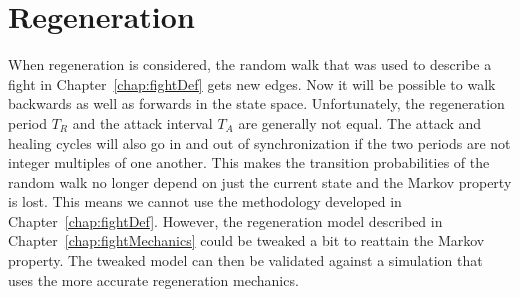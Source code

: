 \section{Regeneration}\label{chap:regen}
When regeneration is considered, the random walk that was used to describe a fight in Chapter~\ref{chap:fightDef} gets new edges. Now it will be possible to walk backwards as well as forwards in the state space. Unfortunately, the regeneration period $T_R$ and the attack interval $T_A$ are generally not equal. The attack and healing cycles will also go in and out of synchronization if the two periods are not integer multiples of one another. This makes the transition probabilities of the random walk no longer depend on just the current state and the Markov property is lost. This means we cannot use the methodology developed in Chapter~\ref{chap:fightDef}. However, the regeneration model described in Chapter~\ref{chap:fightMechanics} could be tweaked a bit to reattain the Markov property. The tweaked model can then be validated against a simulation that uses the more accurate regeneration mechanics.

